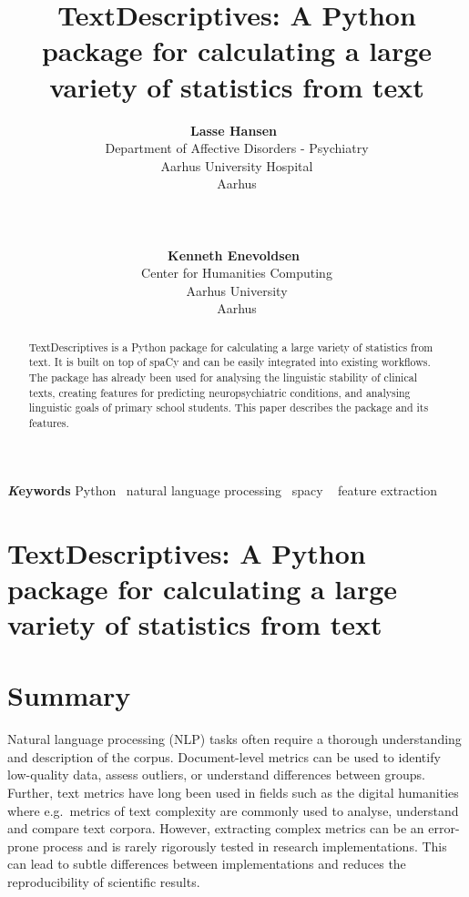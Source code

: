 \documentclass[
]{article}
\title{TextDescriptives: A Python package for calculating a large
variety of statistics from text}
\author{
\textbf{Lasse Hansen}~\orcidlink{0000-0003-1113-4779}\\Department of
Affective Disorders - Psychiatry\\Aarhus University
Hospital\\Aarhus\\\\\\\\
\textbf{Kenneth Enevoldsen}~\orcidlink{0000-0001-8733-0966}\\Center for
Humanities Computing\\Aarhus University\\Aarhus\\}
\date{}
\begin{document}
\maketitle
\begin{abstract}
TextDescriptives is a Python package for calculating a large variety of
statistics from text. It is built on top of spaCy and can be easily
integrated into existing workflows. The package has already been used
for analysing the linguistic stability of clinical texts, creating
features for predicting neuropsychiatric conditions, and analysing
linguistic goals of primary school students. This paper describes the
package and its features.
\end{abstract}
{\bfseries \emph Keywords}
\def\sep{\textbullet\ }
Python \sep natural language processing \sep spacy \sep 
feature extraction

\ifdefined\Shaded\renewenvironment{Shaded}{\begin{tcolorbox}[enhanced, sharp corners, frame hidden, borderline west={3pt}{0pt}{shadecolor}, breakable, interior hidden, boxrule=0pt]}{\end{tcolorbox}}\fi

\hypertarget{textdescriptives-a-python-package-for-calculating-a-large-variety-of-statistics-from-text}{%
\section{TextDescriptives: A Python package for calculating a large
variety of statistics from
text}\label{textdescriptives-a-python-package-for-calculating-a-large-variety-of-statistics-from-text}}

\hypertarget{summary}{%
\section{Summary}\label{summary}}

Natural language processing (NLP) tasks often require a thorough
understanding and description of the corpus. Document-level metrics can
be used to identify low-quality data, assess outliers, or understand
differences between groups. Further, text metrics have long been used in
fields such as the digital humanities where e.g.~metrics of text
complexity are commonly used to analyse, understand and compare text
corpora. However, extracting complex metrics can be an error-prone
process and is rarely rigorously tested in research implementations.
This can lead to subtle differences between implementations and reduces
the reproducibility of scientific results.
\end{document}
